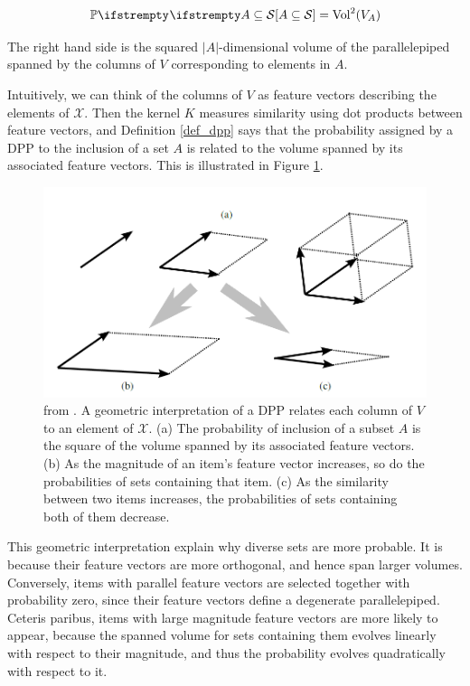 \begin{equation}
    \PP{}{A \subseteq \mathcal{S}} = \operatorname{Vol}^2(V_A)
\end{equation}

The right hand side is the squared $|A|$-dimensional volume of the parallelepiped
spanned by the columns of $V$ corresponding to elements in $A$.

Intuitively, we can think of the columns of $V$ as feature vectors describing the elements
of $\mathcal{X}$. Then the kernel $K$ measures similarity using dot products between feature vectors, and Definition \ref{def_dpp} says that the probability assigned by a DPP to the inclusion of a set $A$ is related to the volume spanned by its associated feature vectors. This is illustrated in Figure \ref{fig_geometric_interpret}.

\begin{figure}[!ht]
    \centering
    \includegraphics[width=0.8\linewidth]{pics/geometric_interpret.png}
    \caption{from \cite{kulesza2012_dpp_for_ml}. A geometric interpretation of a DPP relates each column of $V$ to an element of $\mathcal{X}$. (a) The  probability of inclusion of a subset $A$ is the square of the volume spanned by its associated feature vectors. (b) As the magnitude of an item's feature vector increases, so do the probabilities of sets containing that item. (c) As the similarity between two items increases, the probabilities of sets containing both of them decrease.}
    \label{fig_geometric_interpret}
\end{figure}

This geometric interpretation explain why diverse sets are more probable. It is because their feature vectors are more orthogonal, and hence span larger volumes. Conversely, items with parallel feature vectors are selected together with probability zero, since their feature vectors define a degenerate parallelepiped. Ceteris paribus, items with large magnitude feature vectors are more likely to appear, because the spanned volume for sets containing them evolves linearly with respect to their magnitude, and thus the probability evolves quadratically with respect to it.


